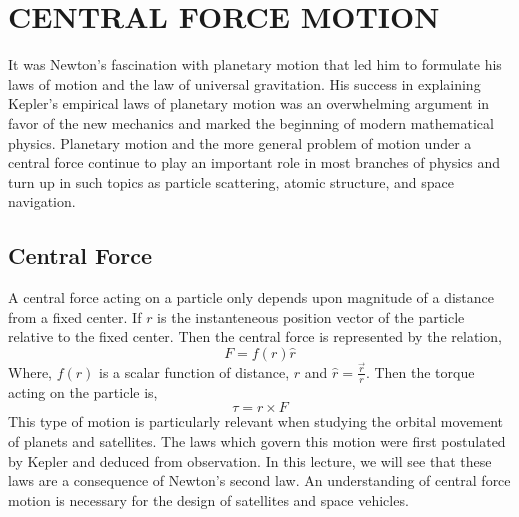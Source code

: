 \chapter{CENTRAL FORCE MOTION}
It was Newton's fascination with planetary motion that led him to formulate his laws of motion and the law of universal gravitation. His success in explaining Kepler's empirical laws of planetary motion was an overwhelming argument in favor of the new mechanics and marked the beginning of modern mathematical physics. Planetary motion and the more general problem of motion under a central force continue to play an important role in most branches of physics and turn up in such topics as particle scattering, atomic structure, and space navigation.
\section{Central Force}
A central force  acting on a particle only depends upon magnitude of a distance from a fixed center. If $r$ is the instanteneous position vector of the particle relative to the fixed center. Then the central force is represented by the relation,
\begin{equation}
F= f(r) \hat{r}
\end{equation}
Where, $f(r)$ is a scalar function of distance, $r$  and $\hat{r}=\frac{\vec{r}}{r}$. Then the torque acting on the particle is,
\begin{equation}
\tau =r\times F
\end{equation}
This type of motion is particularly relevant when studying the orbital movement of planets and satellites. The laws which govern this motion were first postulated by Kepler and deduced from observation. In this lecture, we will see that these laws are a consequence of Newton's second law. An understanding of central force motion is necessary for the design of satellites and space vehicles.
